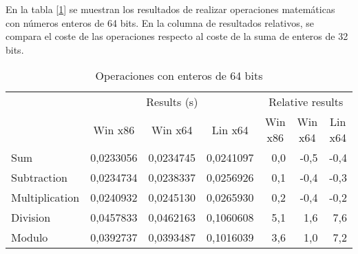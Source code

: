 En la tabla [\ref{tab:int64}] se muestran los resultados de realizar operaciones matemáticas con números enteros de 64 bits. En la columna de resultados relativos, se compara el coste de las operaciones respecto al coste de la suma de enteros de 32 bits.\\

\begin{table}[h]
\centering
\begin{tabular}{@{}l|rrr|rrr|@{}}
\cmidrule(l){2-7}
                                     & \multicolumn{3}{c|}{Results (s)}                                                               & \multicolumn{3}{c|}{Relative results}                                                      \\ \cmidrule(l){2-7} 
                                     & \multicolumn{1}{c|}{Win x86} & \multicolumn{1}{c|}{Win x64} & \multicolumn{1}{c|}{Lin x64} & \multicolumn{1}{c|}{Win x86} & \multicolumn{1}{c|}{Win x64} & \multicolumn{1}{c|}{Lin x64} \\ \midrule
\multicolumn{1}{|l|}{Sum}            & 0,0233056                    & 0,0234745                    & 0,0241097                    & 0,0                          & -0,5                         & -0,4                         \\ \cmidrule(r){1-1}
\multicolumn{1}{|l|}{Subtraction}    & 0,0234734                    & 0,0238337                    & 0,0256926                    & 0,1                          & -0,4                         & -0,3                         \\ \cmidrule(r){1-1}
\multicolumn{1}{|l|}{Multiplication} & 0,0240932                    & 0,0245130                    & 0,0265930                    & 0,2                          & -0,4                         & -0,2                         \\ \cmidrule(r){1-1}
\multicolumn{1}{|l|}{Division}       & 0,0457833                    & 0,0462163                    & 0,1060608                    & 5,1                          & 1,6                          & 7,6                          \\ \cmidrule(r){1-1}
\multicolumn{1}{|l|}{Modulo}         & 0,0392737                    & 0,0393487                    & 0,1016039                    & 3,6                          & 1,0                          & 7,2                          \\ \bottomrule
\end{tabular}
\caption{Operaciones con enteros de 64 bits}
\label{tab:int64}
\end{table}

